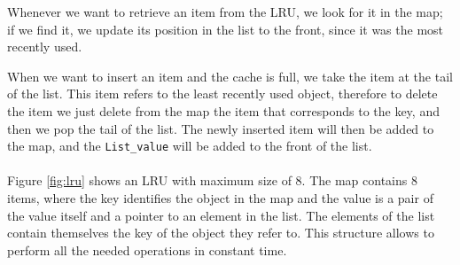 Whenever we want to retrieve an item from the LRU, we look for it in the map; if we find it, we update its position in the list to the front, since it was the most recently used.

When we want to insert an item and the cache is full, we take the item at the tail of the list. This item refers to the least recently used object, therefore to delete the item we just delete from the map the item that corresponds to the key, and then we pop the tail of the list. The newly inserted item will then be added to the map, and the \texttt{List\_value} will be added to the front of the list.
\\\\
Figure \ref{fig:lru} shows an LRU with maximum size of 8. The map contains 8 items, where the key identifies the object in the map and the value is a pair of the value itself and a pointer to an element in the list. The elements of the list contain themselves the key of the object they refer to. This structure allows to perform all the needed operations in constant time. 

